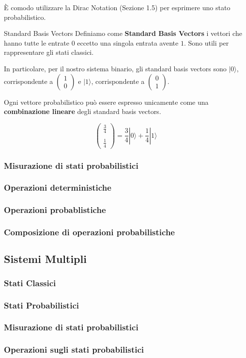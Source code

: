 È comodo utilizzare la Dirac Notation (Sezione 1.5) per esprimere uno stato probabilistico.

\begin{definition}{Standard Basis Vectors}{}
    Definiamo come \textbf{Standard Basis Vectors} i vettori che hanno tutte le entrate $0$ eccetto una singola entrata avente $1$. Sono utili per rappresentare gli stati classici.
\end{definition}
In particolare, per il nostro sistema binario, gli standard basis vectors sono $|0\rangle$, corrispondente a 
$\left(\begin{array}{c}
         1  \\
         0
    \end{array}\right)$
e $|1\rangle$, corrispondente a $\left(\begin{array}{c}
         0  \\
         1
    \end{array}\right)$.

\begin{fact}{}{}
    Ogni vettore probabilistico può essere espresso unicamente come una \textbf{combinazione lineare} degli standard basis vectors.
\end{fact}
\begin{example}{}{}
    \begin{equation*}
        \left(\begin{array}{c}
         \frac{3}{4}  \\ \\
         \frac{1}{4}
    \end{array}\right) = \frac{3}{4} |0\rangle +  \frac{1}{4} |1\rangle
    \end{equation*}
\end{example}
\subsubsection{Misurazione di stati probabilistici}
\subsubsection{Operazioni deterministiche}
\subsubsection{Operazioni probablistiche}
\subsubsection{Composizione di operazioni probabilistiche}
\subsection{Sistemi Multipli}
\subsubsection{Stati Classici}
\subsubsection{Stati Probabilistici}
\subsubsection{Misurazione di stati probabilistici}
\subsubsection{Operazioni sugli stati probabilistici}
